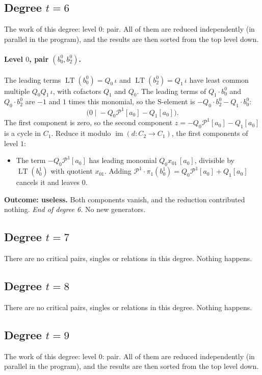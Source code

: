 \documentclass[11pt]{article}
\renewcommand{\P}{\mathcal{P}}
\DeclareMathOperator{\LT}{LT}
\begin{document}
\subsection*{Degree $t = 6$}
\noindent The work of this degree: level $0$: pair. All of them are reduced independently (in parallel in the program), and the results are then sorted from the top level down.
\medskip
\paragraph{Level $0$, pair $(b^{0}_{0}, b^{0}_{2})$.} The leading terms $\LT(b^{0}_{0}) = Q_{0}\,\iota$ and $\LT(b^{0}_{2}) = Q_{1}\,\iota$ have least common multiple $Q_{0}Q_{1}\,\iota$, with cofactors $Q_{1}$ and $Q_{0}$.
The leading terms of $Q_{1}\cdot b^{0}_{0}$ and $Q_{0}\cdot b^{0}_{2}$ are $-1$ and $1$ times this monomial, so the S-element is $-Q_{0}\cdot b^{0}_{2} - Q_{1}\cdot b^{0}_{0}$:
\[\bigl(0 \;\big|\; -Q_{0}\P^{1}[a_0] - Q_{1}[a_0]\bigr).\]
The first component is zero, so the second component $z = -Q_{0}\P^{1}[a_0] - Q_{1}[a_0]$ is a cycle in $C_{1}$.
Reduce it modulo $\operatorname{im}(d\colon C_{2}\to C_{1})$, the first components of level $1$:
\begin{itemize}
\item The term $-Q_{0}\P^{1}[a_0]$ has leading monomial $Q_{0}x_{01}\,[a_0]$, divisible by $\LT(b^{1}_{0})$ with quotient $x_{01}$. Adding $\P^{1}\cdot \pi_1(b^{1}_{0}) = Q_{0}\P^{1}[a_0] + Q_{1}[a_0]$ cancels it and leaves $0$.
\end{itemize}
\textbf{Outcome: useless.} Both components vanish, and the reduction contributed nothing.
\medskip\noindent\emph{End of degree 6.} No new generators.
\subsection*{Degree $t = 7$}
\noindent There are no critical pairs, singles or relations in this degree. Nothing happens.
\subsection*{Degree $t = 8$}
\noindent There are no critical pairs, singles or relations in this degree. Nothing happens.
\subsection*{Degree $t = 9$}
\noindent The work of this degree: level $0$: pair. All of them are reduced independently (in parallel in the program), and the results are then sorted from the top level down.
\medskip
\end{document}
